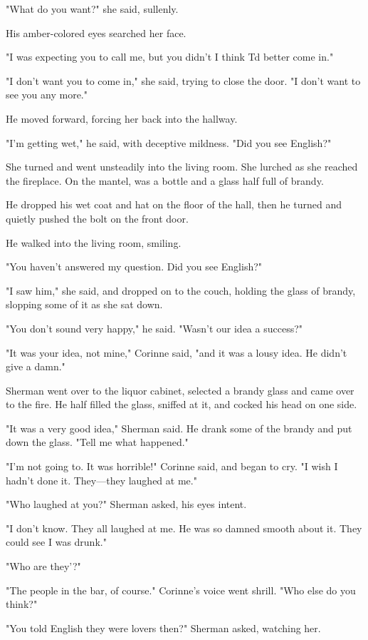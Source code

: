 \documentclass{novel}
\begin{document}
"What do you want?" she said, sullenly.

His amber-colored eyes searched her face.

"I was expecting you to call me, but you didn't I think Td better come in."

"I don't want you to come in," she said, trying to close the door. "I don't want to see you any more."

He moved forward, forcing her back into the hallway.

"I'm getting wet," he said, with deceptive mildness. "Did you see English?"

She turned and went unsteadily into the living room. She lurched as she reached the fireplace. On the mantel, was a bottle and a glass half full of brandy.

He dropped his wet coat and hat on the floor of the hall, then he turned and quietly pushed the bolt on the front door.

He walked into the living room, smiling.

"You haven't answered my question. Did you see English?"

"I saw him," she said, and dropped on to the couch, holding the glass of brandy, slopping some of it as she sat down.

"You don't sound very happy," he said. "Wasn't our idea a success?"

"It was your idea, not mine," Corinne said, "and it was a lousy idea. He didn't give a damn."

Sherman went over to the liquor cabinet, selected a brandy glass and came over to the fire. He half filled the glass, sniffed at it, and cocked his head on one side.

"It was a very good idea," Sherman said. He drank some of the brandy and put down the glass. "Tell me what happened."

"I'm not going to. It was horrible!" Corinne said, and began to cry. "I wish I hadn't done it. They—they laughed at me."

"Who laughed at you?" Sherman asked, his eyes intent.

"I don't know. They all laughed at me. He was so damned smooth about it. They could see I was drunk."

"Who are they'?"

"The people in the bar, of course." Corinne's voice went shrill. "Who else do you think?"

"You told English they were lovers then?" Sherman asked, watching her.
\end{document}
